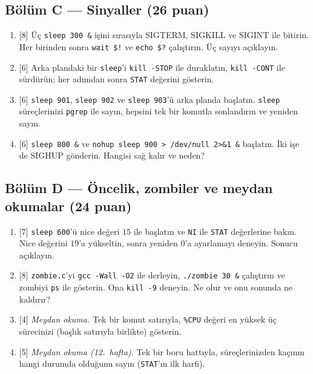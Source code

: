 \documentclass[11pt,a4paper]{article}
\newcommand{\cmd}[1]{\texttt{#1}}
\begin{document}
\subsection*{Bölüm C --- Sinyaller (26 puan)}
\begin{enumerate}[leftmargin=2.2em,label=\textbf{C\arabic*}]
  \item {[8]} Üç \cmd{sleep 300 \&} işini sırasıyla SIGTERM, SIGKILL ve SIGINT ile bitirin. Her birinden sonra \cmd{wait \$!} ve \cmd{echo \$?} çalıştırın. Üç sayıyı açıklayın.
  \item {[6]} Arka plandaki bir \cmd{sleep}'i \cmd{kill -STOP} ile duraklatın, \cmd{kill -CONT} ile sürdürün; her adımdan sonra \texttt{STAT} değerini gösterin.
  \item {[6]} \cmd{sleep 901}, \cmd{sleep 902} ve \cmd{sleep 903}'ü arka planda başlatın. \cmd{sleep} süreçlerinizi \cmd{pgrep} ile sayın, hepsini tek bir komutla sonlandırın ve yeniden sayın.
  \item {[6]} \cmd{sleep 800 \&} ve \cmd{nohup sleep 900 > /dev/null 2>\&1 \&} başlatın. İki işe de SIGHUP gönderin. Hangisi sağ kalır ve neden?
\end{enumerate}

\subsection*{Bölüm D --- Öncelik, zombiler ve meydan okumalar (24 puan)}
\begin{enumerate}[leftmargin=2.2em,label=\textbf{D\arabic*}]
  \item {[7]} \cmd{sleep 600}'ü nice değeri $15$ ile başlatın ve \texttt{NI} ile \texttt{STAT} değerlerine bakın. Nice değerini $19$'a yükseltin, sonra yeniden $0$'a ayarlamayı deneyin. Sonucu açıklayın.
  \item {[8]} \texttt{zombie.c}'yi \cmd{gcc -Wall -O2} ile derleyin, \cmd{./zombie 30 \&} çalıştırın ve zombiyi \cmd{ps} ile gösterin. Ona \cmd{kill -9} deneyin. Ne olur ve onu sonunda ne kaldırır?
  \item {[4]} \emph{Meydan okuma.} Tek bir komut satırıyla, \texttt{\%CPU} değeri en yüksek üç sürecinizi (başlık satırıyla birlikte) gösterin.
  \item {[5]} \emph{Meydan okuma (12.~hafta).} Tek bir boru hattıyla, süreçlerinizden kaçının hangi durumda olduğunu sayın (\texttt{STAT}'ın ilk harfi).
\end{enumerate}

\end{document}

